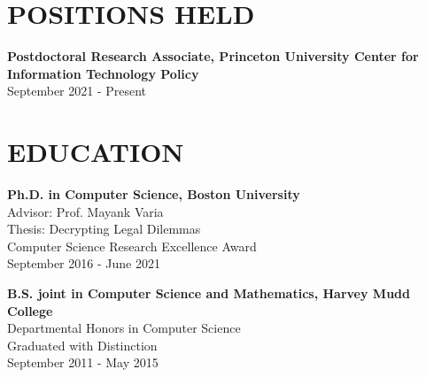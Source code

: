 \documentclass{res}
\begin{document}
 



\address{\texttt{sarah.ann.scheffler@gmail.com}\\\texttt{https://sarahscheffler.net}\\\texttt{https://github.com/sarahscheffler}}
\address{~~~~~~~~~~18 Vandeventer Ave \#1\\~~~~~~~~~~~~~~Princeton, NJ 08542\\~~~~~~~~~~~~~~~~~~~~\hspace{-0.049cm}(720) 234 - 6853}
                                  
\begin{resume}


    \vspace{0.1in}
\section{POSITIONS HELD}  
\vspace{0.1in}

    \textbf{Postdoctoral Research Associate, Princeton University Center for Information Technology Policy} \\
    September 2021 - Present

    \vspace{0.1in}
\section{EDUCATION}  
\vspace{0.1in}

    \textbf{Ph.D. in Computer Science, Boston University} \\
    Advisor: Prof. Mayank Varia \\
    Thesis: Decrypting Legal Dilemmas \\
    Computer Science Research Excellence Award \\
    September 2016 - June 2021

    \textbf{B.S. joint in Computer Science and Mathematics, Harvey Mudd College}  \\        
    Departmental Honors in Computer Science \\
    Graduated with Distinction \\
    September 2011 - May 2015


\end{resume}
\end{document}
